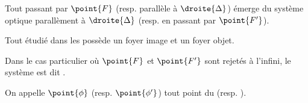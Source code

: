 \begin{definitions}
\begin{figure}[H]
\begin{center}
\end{center}
\end{figure}
\end{definitions}

\begin{propriete}
Tout  passant par $\point{F}$ (resp. parallèle à $\droite{\Delta}$) émerge du système optique parallèment à $\droite{\Delta}$ (resp. en passant par $\point{F'}$).
\end{propriete}

\begin{propriete}[admis]
Tout  étudié dans les  possède un foyer image et un foyer objet.
\end{propriete}

\begin{vocabulaire}
Dans le cas particulier où $\point{F}$ et $\point{F'}$ sont rejetés à l'infini, le système est dit .
\end{vocabulaire}

\begin{definitions}
On appelle  $\point{\phi}$ (resp.  $\point{\phi'}$) tout point du  (resp. ).
\end{definitions}


